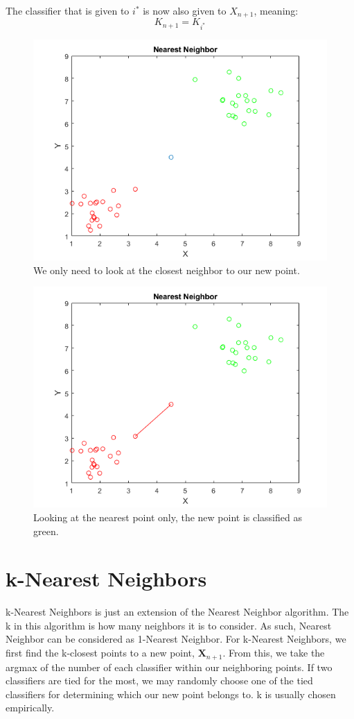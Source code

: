\documentclass{article}
\theoremstyle{definition}
\begin{document}
The classifier that is given to $i^*$ is now also given to $X_{n+1}$, meaning:
\begin{equation}
K_{n+1} = K_{i^*}
\end{equation}

\begin{figure}[H]
	\centering
	\includegraphics[width=0.5\linewidth, scale=0.5]{Nnbefore.png}
	\caption{We only need to look at the closest neighbor to our new point.}
\end{figure}

\begin{figure}[H]
	\centering
	\includegraphics[width=0.5\linewidth, scale=0.5]{Nnafter.png}
	\caption{Looking at the nearest point only, the new point is classified as green.}
\end{figure}

\section{k-Nearest Neighbors}

k-Nearest Neighbors is just an extension of the Nearest Neighbor algorithm. The k in this algorithm is how many neighbors it is to consider. As such, Nearest Neighbor can be considered as 1-Nearest Neighbor. For k-Nearest Neighbors, we first find the k-closest points to a new point, $\textbf{X}_{n+1}$. From this, we take the argmax of the number of each classifier within our neighboring points. If two classifiers are tied for the most, we may randomly choose one of the tied classifiers for determining which our new point belongs to. k is usually chosen empirically.
\end{document}
